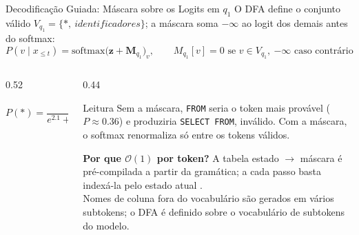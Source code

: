 \documentclass[aspectratio=169, xcolor=dvipsnames]{beamer}
\begin{document}
  \begin{frame}{Decodificação Guiada: Máscara sobre os Logits em $q_1$}
    \small O DFA define o conjunto válido $V_{q_1} = \{\texttt{*},\ \textit{identificadores}\}$; a máscara soma $-\infty$ ao logit dos demais antes do softmax:
    \[
      P(v \mid x_{\le t}) = \text{softmax}\bigl(\mathbf{z} + \mathbf{M}_{q_1}\bigr)_v,
      \qquad
      M_{q_1}[v] = 0 \text{ se } v \in V_{q_1},\ {-\infty} \text{ caso contrário}
    \]
    \begin{columns}[T]
      \begin{column}{0.52\textwidth}

        {\footnotesize $P(\texttt{*}) = \dfrac{e^{2.1}}{e^{2.1}+e^{1.8}+e^{0.9}} = \dfrac{8.2}{16.7} \approx 0.49$}
      \end{column}
      \begin{column}{0.44\textwidth}
        \begin{exampleblock}{Leitura}
          \small Sem a máscara, \texttt{FROM} seria o token mais provável ($P \approx 0.36$) e produziria \texttt{SELECT FROM}, inválido. Com a máscara, o softmax renormaliza só entre os tokens válidos.
        \end{exampleblock}
        {\scriptsize \textbf{Por que $\mathcal{O}(1)$ por token?} A tabela estado $\to$ máscara é pré-compilada a partir da gramática; a cada passo basta indexá-la pelo estado atual \cite{willard2023guided}.\\[0.1em]
        Nomes de coluna fora do vocabulário são gerados em vários subtokens; o DFA é definido sobre o vocabulário de subtokens do modelo.\par}
      \end{column}
    \end{columns}
  \end{frame}
\end{document}
